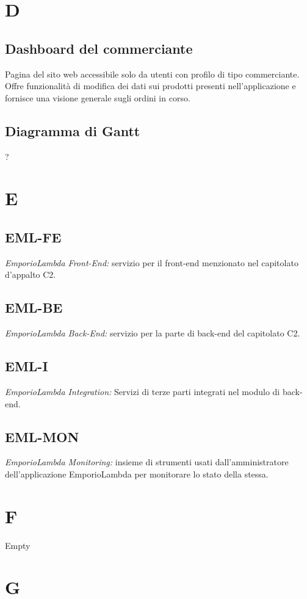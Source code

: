 \section*{D}
\subsection*{Dashboard del commerciante}
Pagina del sito web accessibile solo da utenti con profilo di tipo commerciante. Offre funzionalità di modifica dei dati sui prodotti
presenti nell'applicazione e fornisce una visione generale sugli ordini in corso.

\subsection*{Diagramma di Gantt}
?
\section*{E}
\subsection*{EML-FE}
\textit{EmporioLambda Front-End:} servizio per il front-end menzionato nel capitolato d'appalto C2.

\subsection*{EML-BE}
\textit{EmporioLambda Back-End:} servizio per la parte di back-end del capitolato C2.

\subsection*{EML-I}
\textit{EmporioLambda Integration:} Servizi di terze parti integrati nel modulo di back-end.

\subsection*{EML-MON}
\textit{EmporioLambda Monitoring:} insieme di strumenti usati dall'amministratore dell'applicazione EmporioLambda
per monitorare lo stato della stessa.

\section*{F}
Empty

\section*{G}
